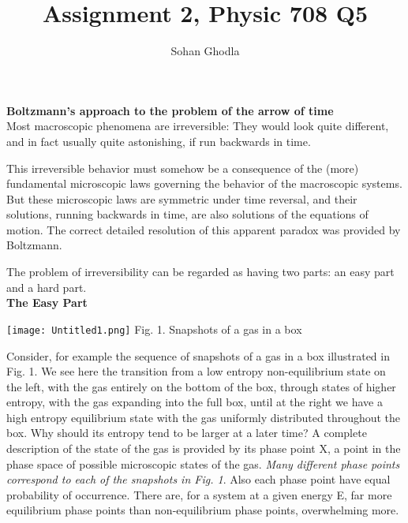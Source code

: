 \documentclass[11pt]{article}
\begin{document}
	\title{Assignment 2, Physic 708 Q5}
	
	\author{Sohan Ghodla}
	\maketitle
	
\textbf{Boltzmann's approach to the problem of the arrow of time}\\

Most macroscopic phenomena are irreversible: They would look quite different, and in fact usually quite astonishing, if run backwards in time.

This irreversible behavior must somehow be a consequence of the (more) fundamental microscopic laws governing the behavior
of the macroscopic systems.
But these microscopic laws are symmetric under time reversal, and their solutions, running backwards in time, are also solutions of the equations of motion. The correct detailed resolution of this apparent
paradox was provided by Boltzmann.

The problem of irreversibility can be regarded as having two parts: an easy part and a hard part.\\

\textbf{The Easy Part}

\begin{center}
\texttt{[image: Untitled1.png]}
Fig. 1. Snapshots of a gas in a box
\end{center}

Consider, for example the sequence of snapshots of a gas in a box illustrated
in Fig. 1. We see here the transition from a low entropy non-equilibrium state on the left, with the gas entirely on the bottom of the box, through states of higher entropy, with the gas expanding into the full box, until at the right we have a high entropy equilibrium state with the gas uniformly distributed throughout the box. Why should its entropy tend to be larger at a later time?
A complete description of the state of the gas is provided by its phase point X, a point in the phase space of possible microscopic states of the gas. \textit{Many different phase points correspond to each of the snapshots in Fig. 1}. Also each phase point have equal probability of occurrence. There are, for a system at a given energy E, far more equilibrium phase points than non-equilibrium phase points, overwhelming more.\\
\end{document}

